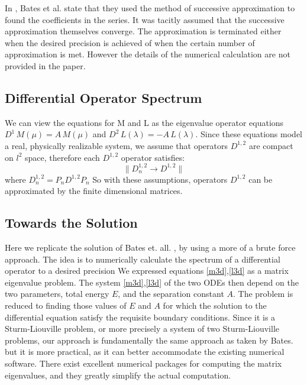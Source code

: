 In \cite{Bates1}, Bates et al. state that they used the method of successive approximation to found the coefficients in the series. It was tacitly assumed that the successive approximation themselves converge. The approximation is terminated either when the desired precision is achieved of when the certain number of approximation is met. However the details of the numerical calculation are not provided in the paper.

\subsection{Differential Operator Spectrum}

We can view the equations for M and L as the eigenvalue operator equations $ D^1\,M(\mu) = A\,M(\mu) $ and $ D^2\,L(\lambda)= -A\,L(\lambda) $.
Since these equations model a real, physically realizable system, we assume that operators $ D^{1,2} $  are compact on $ l^2 $ space, therefore each $ D^{1,2} $ operator satisfies:
\begin{equation}
\| D_n^{1,2} \rightarrow D^{1,2} \|
\end{equation}
where $ D_n^{1,2} = P_nD^{1,2}P_n $
So with these assumptions, operators $ D^{1,2} $ can be approximated by the finite dimensional matrices.

\subsection{Towards the Solution}

Here we replicate the solution of Bates et. all. \cite{Bates1}\cite{Bates2}, by using a more of a brute force approach. The idea is to numerically calculate the spectrum of a differential operator to a desired precision
We expressed equations \eqref{m3d},\eqref{l3d} as a matrix eigenvalue problem. 
The system \eqref{m3d},\eqref{l3d} of the two ODEs then depend on the two parameters, total energy $ E $, and the separation constant $ A $. The problem is reduced to finding those values of $ E $ and $ A $ for which the solution to the differential equation satisfy the requisite boundary conditions. 
Since it is a  Sturm-Liouville problem, or more precisely a system of two Sturm-Liouville problems, our approach is fundamentally the same approach as taken by Bates. but it is more practical, as it can better accommodate the existing numerical software. There exist excellent numerical packages \cite{Lapack1} for computing the matrix eigenvalues, and they greatly simplify the actual computation.

